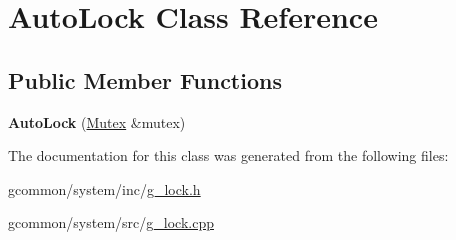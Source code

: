 \hypertarget{class_auto_lock}{\section{Auto\-Lock Class Reference}
\label{class_auto_lock}
}
\subsection*{Public Member Functions}
\begin{DoxyCompactItemize}
\item 
\hypertarget{class_auto_lock_af3e0ba7022f4c7826f5a5dfa46ebf841}{{\bfseries Auto\-Lock} (\hyperlink{class_mutex}{Mutex} \&mutex)}\label{class_auto_lock_af3e0ba7022f4c7826f5a5dfa46ebf841}

\end{DoxyCompactItemize}


The documentation for this class was generated from the following files\-:\begin{DoxyCompactItemize}
\item 
gcommon/system/inc/\hyperlink{g__lock_8h}{g\-\_\-lock.\-h}\item 
gcommon/system/src/\hyperlink{g__lock_8cpp}{g\-\_\-lock.\-cpp}\end{DoxyCompactItemize}
